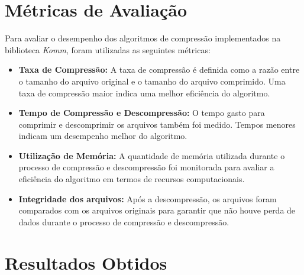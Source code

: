 \pagebreak
\section{Métricas de Avaliação}
Para avaliar o desempenho dos algoritmos de compressão implementados na biblioteca \textit{Komm}, foram utilizadas as seguintes métricas:
\begin{itemize}
    \item \textbf{Taxa de Compressão:} A taxa de compressão é definida como a razão entre o tamanho do arquivo original e o tamanho do arquivo comprimido. Uma taxa de compressão maior indica uma melhor eficiência do algoritmo.
    \item \textbf{Tempo de Compressão e Descompressão:} O tempo gasto para comprimir e descomprimir os arquivos também foi medido. Tempos menores indicam um desempenho melhor do algoritmo.
    \item \textbf{Utilização de Memória:} A quantidade de memória utilizada durante o processo de compressão e descompressão foi monitorada para avaliar a eficiência do algoritmo em termos de recursos computacionais.
    \item \textbf{Integridade dos arquivos: } Após a descompressão, os arquivos foram comparados com os arquivos originais para garantir que não houve perda de dados durante o processo de compressão e descompressão.
\end{itemize}

\section{Resultados Obtidos}
